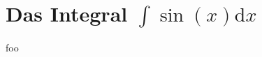 \documentclass{article}
\begin{document}
\tableofcontents
\section{Das Integral \( \int \sin(x)\mathrm{d}x \) }
foo
\end{document}

